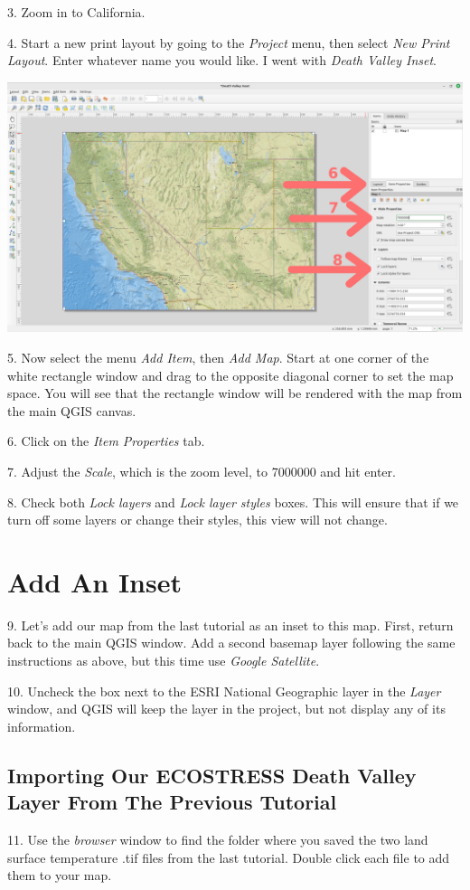 \documentclass[oneside,a4paper,11pt,explicit]{book}
\begin{document}
3. Zoom in to California.

4. Start a new print layout by going to the \textit{Project} menu, then select \textit{New Print Layout}. Enter whatever name you would like. I went with \textit{Death Valley Inset}.


\centerline{\includegraphics[width=\textwidth]{InsetItem.png}}

5. Now select the menu \textit{Add Item}, then \textit{Add Map}. Start at one corner of the white rectangle window and drag to the opposite diagonal corner to set the map space. You will see that the rectangle window will be rendered with the map from the main QGIS canvas.

6. Click on the \textit{Item Properties} tab.

7. Adjust the \textit{Scale}, which is the zoom level, to 7000000 and hit enter.

8. Check both \textit{Lock layers} and \textit{Lock layer styles} boxes. This will ensure that if we turn off some layers or change their styles, this view will not change.


\section{Add An Inset}

9. Let's add our map from the last tutorial as an inset to this map. First, return back to the main QGIS window. Add a second basemap layer following the same instructions as above, but this time use \textit{Google Satellite}.

10. Uncheck the box next to the ESRI National Geographic layer in the \emph{Layer} window, and QGIS will keep the layer in the project, but not display any of its information.

\subsection{Importing Our ECOSTRESS Death Valley Layer From The Previous Tutorial}
11. Use the \textit{browser} window to find the folder where you saved the two land surface temperature .tif files from the last tutorial. Double click each file to add them to your map.
\end{document}

